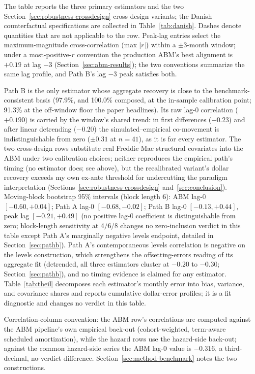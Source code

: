 \documentclass[12pt]{article}
\begin{document}
\begin{table}[H]
\begin{threeparttable}
\begin{tablenotes}[flushleft]
\item The table reports the three primary estimators and the two Section~\ref{sec:robustness-crossdesign} cross-design variants; the Danish counterfactual specifications are collected in Table~\ref{tab:danish}. Dashes denote quantities that are not applicable to the row. Peak-lag entries select the maximum-magnitude cross-correlation (max $|r|$) within a $\pm$3-month window; under a most-positive-$r$ convention the production ABM's best alignment is $+0.19$ at lag $-3$ (Section~\ref{sec:abm-results}); the two conventions summarize the same lag profile, and Path B's lag $-3$ peak satisfies both.
\item Path B is the only estimator whose aggregate recovery is close to the benchmark-consistent basis (97.9\%, and 100.0\% composed, at the in-sample calibration point; 91.3\% at the off-window floor the paper headlines). Its raw lag-0 correlation ($+0.190$) is carried by the window's shared trend: in first differences ($-0.23$) and after linear detrending ($-0.20$) the simulated--empirical co-movement is indistinguishable from zero ($\pm 0.31$ at $n = 41$), as it is for every estimator. The two cross-design rows substitute real Freddie Mac structural covariates into the ABM under two calibration choices; neither reproduces the empirical path's timing (no estimator does; see above), but the recalibrated variant's dollar recovery exceeds my own ex-ante threshold for undercutting the paradigm interpretation (Sections~\ref{sec:robustness-crossdesign} and~\ref{sec:conclusion}). Moving-block bootstrap 95\% intervals (block length 6): ABM lag-0 $[-0.60, +0.04]$; Path A lag-0 $[-0.68, -0.02]$; Path B lag-0 $[-0.13, +0.44]$, peak lag $[-0.21, +0.49]$ (no positive lag-0 coefficient is distinguishable from zero; block-length sensitivity at 4/6/8 changes no zero-inclusion verdict in this table except Path A's marginally negative levels endpoint, detailed in Section~\ref{sec:pathb}). Path A's contemporaneous levels correlation is negative on the levels construction, which strengthens the offsetting-errors reading of its aggregate fit (detrended, all three estimators cluster at $-0.20$ to $-0.30$; Section~\ref{sec:pathb}), and no timing evidence is claimed for any estimator. Table~\ref{tab:theil} decomposes each estimator's monthly error into bias, variance, and covariance shares and reports cumulative dollar-error profiles; it is a fit diagnostic and changes no verdict in this table.
\item Correlation-column convention: the ABM row's correlations are computed against the ABM pipeline's own empirical back-out (cohort-weighted, term-aware scheduled amortization), while the hazard rows use the hazard-side back-out; against the common hazard-side series the ABM lag-0 value is $-0.316$, a third-decimal, no-verdict difference. Section~\ref{sec:method-benchmark} notes the two constructions.

\end{tablenotes}
\end{threeparttable}
\end{table}
\end{document}
